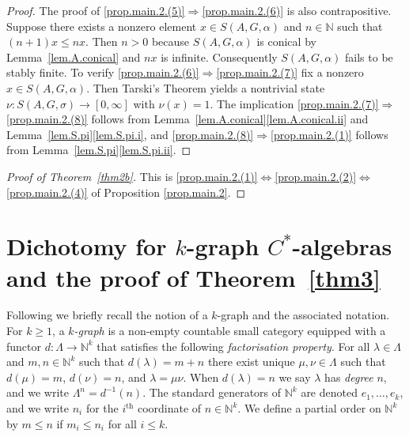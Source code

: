 \documentclass[a4paper, 12pt]{amsart}
\numberwithin{equation}{section}
\theoremstyle{remark}
\theoremstyle{definition}
\begin{document}
\begin{proof}
The proof of \eqref{prop.main.2.(5)}$\Rightarrow$\eqref{prop.main.2.(6)} is also
contrapositive. Suppose there exists a nonzero element $x\in S(A,G,\alpha)$ and $n\in
{\mathbb{N}}$ such that $(n+1)x\leq nx$. Then $n>0$ because $S(A,G,\alpha)$ is conical by
Lemma~\ref{lem.A.conical} and $nx$ is infinite. Consequently $S(A,G,\alpha)$ fails to be
stably finite. To verify \eqref{prop.main.2.(6)}$\Rightarrow$\eqref{prop.main.2.(7)} fix
a nonzero $x\in S(A,G,\alpha)$. Then Tarski's Theorem yields a nontrivial state
$\nu\colon S(A,G,\sigma)\to [0,\infty]$ with $\nu(x)=1$. The implication
\eqref{prop.main.2.(7)}$\Rightarrow$\eqref{prop.main.2.(8)} follows from
Lemma~\ref{lem.A.conical}\eqref{lem.A.conical.ii} and
Lemma~\ref{lem.S.pi}\eqref{lem.S.pi.i}, and
\eqref{prop.main.2.(8)}$\Rightarrow$\eqref{prop.main.2.(1)} follows from
Lemma~\ref{lem.S.pi}\eqref{lem.S.pi.ii}.
\end{proof}

\begin{proof}[Proof of Theorem~\ref{thm2b}]
This is \eqref{prop.main.2.(1)}$\Leftrightarrow$\eqref{prop.main.2.(2)}$\Leftrightarrow$\eqref{prop.main.2.(4)} of Proposition \ref{prop.main.2}.
\end{proof}

\section{Dichotomy for \texorpdfstring{$k$}{k}-graph \texorpdfstring{$C^*$}{C*}-algebras and the proof of Theorem~\ref{thm3}}
\label{app.two}

Following \cite{MR1745529, MR2139097, MR1961175} we briefly recall the notion of a
$k$-graph and the associated notation. For $k \ge 1$, a \emph{$k$-graph} is a non-empty
countable small category equipped with a functor $d : \Lambda \to {\mathbb{N}}^k$ that satisfies
the following \emph{factorisation property}. For all $\lambda \in \Lambda$ and $m,n\in
{\mathbb{N}}^k$ such that $d(\lambda) = m + n$ there exist unique $\mu, \nu\in \Lambda$ such that
$d(\mu) = m$, $d(\nu) = n$, and $\lambda = \mu\nu$. When $d(\lambda) = n$ we say
$\lambda$ has \emph{degree} $n$, and we write $\Lambda^n = d^{-1}(n)$. The standard
generators of ${\mathbb{N}}^k$ are denoted $e_1, \dots ,e_k$, and we write $n_i$ for the
$i^{\textrm{th}}$ coordinate of $n \in {\mathbb{N}}^k$. We define a partial
order on ${\mathbb{N}}^k$ by $m\leq n$ if $m_i\leq n_i$ for all $i\leq k$.
\end{document}
